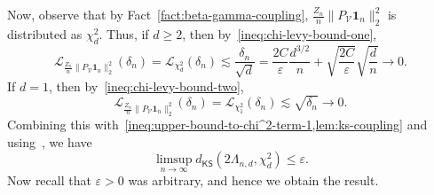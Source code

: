 \documentclass[11pt, letterpaper, hidelinks]{article}
\newcommand{\cL}{\mathcal{L}}
\newcommand{\cV}{\mathcal{V}}
\newcommand{\1}{\mathbf 1}
\newcommand{\eps}{\varepsilon}
\renewcommand{\leq}{\leqslant}
\renewcommand{\geq}{\geqslant}
\theoremstyle{plain}
\theoremstyle{definition}
\newcommand{\KSDist}[2]{d_{\mathsf{KS}}\left(#1, #2\right)}
\begin{document}
Now, observe that by Fact~\ref{fact:beta-gamma-coupling}, $\tfrac{Z_n}{n} \|P_\cV \1_n\|_2^2$ is distributed as $\chi^2_d$. Thus, if $d\geq2$, then by~\ref{ineq:chi-levy-bound-one},
\[
\cL_{\tfrac{Z_n}{n} \|P_\cV \1_n\|_2^2}(\delta_n) = 
\cL_{\chi^2_d}(\delta_n) \lesssim \frac{\delta_n}{\sqrt{d}} 
= \frac{2C}{\eps}\frac{d^{3/2}}{n}
+\sqrt{\frac{2C}{\eps}}\sqrt{\frac{d}{n}} \longrightarrow 0.
\]
If $d=1$, then by~\ref{ineq:chi-levy-bound-two},
\[
	\cL_{\tfrac{Z_n}{n} \|P_\cV \1_n\|_2^2}(\delta_n) = 
	\cL_{\chi^2_1}(\delta_n) \lesssim \sqrt{\delta_n}\longrightarrow0.
\]
Combining this with~\cref{ineq:upper-bound-to-chi^2-term-1,lem:ks-coupling} and using~, we have 
\[
\limsup_{n \to \infty} \KSDist{2\Lambda_{n,d}}{\chi^2_d} \leq \eps.
\]
Now recall that $\eps > 0$ was arbitrary, and hence we obtain the result.
\end{document}
